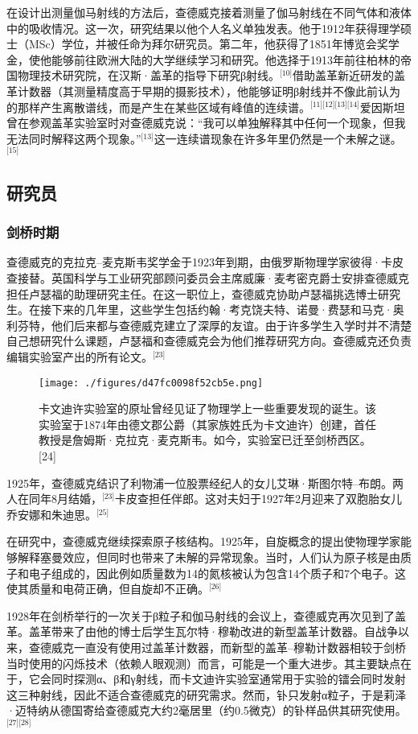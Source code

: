 在设计出测量伽马射线的方法后，查德威克接着测量了伽马射线在不同气体和液体中的吸收情况。这一次，研究结果以他个人名义单独发表。他于1912年获得理学硕士（MSc）学位，并被任命为拜尔研究员。第二年，他获得了1851年博览会奖学金，使他能够前往欧洲大陆的大学继续学习和研究。他选择于1913年前往柏林的帝国物理技术研究院，在汉斯·盖革的指导下研究β射线。\(^\text{[10]}\)借助盖革新近研发的盖革计数器（其测量精度高于早期的摄影技术），他能够证明β射线并不像此前认为的那样产生离散谱线，而是产生在某些区域有峰值的连续谱。\(^\text{[11][12][13][14]}\)爱因斯坦曾在参观盖革实验室时对查德威克说：“我可以单独解释其中任何一个现象，但我无法同时解释这两个现象。”\(^\text{[13]}\)这一连续谱现象在许多年里仍然是一个未解之谜。\(^\text{[15]}\)
\subsection{研究员}
\subsubsection{剑桥时期}
查德威克的克拉克–麦克斯韦奖学金于1923年到期，由俄罗斯物理学家彼得·卡皮查接替。英国科学与工业研究部顾问委员会主席威廉·麦考密克爵士安排查德威克担任卢瑟福的助理研究主任。在这一职位上，查德威克协助卢瑟福挑选博士研究生。在接下来的几年里，这些学生包括约翰·考克饶夫特、诺曼·费瑟和马克·奥利芬特，他们后来都与查德威克建立了深厚的友谊。由于许多学生入学时并不清楚自己想研究什么课题，卢瑟福和查德威克会为他们推荐研究方向。查德威克还负责编辑实验室产出的所有论文。\(^\text{[23]}\)
\begin{figure}[ht]
\centering
\texttt{[image: ./figures/d47fc0098f52cb5e.png]}
\caption{卡文迪许实验室的原址曾经见证了物理学上一些重要发现的诞生。该实验室于1874年由德文郡公爵（其家族姓氏为卡文迪许）创建，首任教授是詹姆斯·克拉克·麦克斯韦。如今，实验室已迁至剑桥西区。[24]} \label{fig_ZMcdw_1}
\end{figure}
1925年，查德威克结识了利物浦一位股票经纪人的女儿艾琳·斯图尔特–布朗。两人在同年8月结婚，\(^\text{[23]}\)卡皮查担任伴郎。这对夫妇于1927年2月迎来了双胞胎女儿乔安娜和朱迪思。\(^\text{[25]}\)

在研究中，查德威克继续探索原子核结构。1925年，自旋概念的提出使物理学家能够解释塞曼效应，但同时也带来了未解的异常现象。当时，人们认为原子核是由质子和电子组成的，因此例如质量数为14的氮核被认为包含14个质子和7个电子。这使其质量和电荷正确，但自旋却不正确。\(^\text{[26]}\)

1928年在剑桥举行的一次关于β粒子和伽马射线的会议上，查德威克再次见到了盖革。盖革带来了由他的博士后学生瓦尔特·穆勒改进的新型盖革计数器。自战争以来，查德威克一直没有使用过盖革计数器，而新型的盖革–穆勒计数器相较于剑桥当时使用的闪烁技术（依赖人眼观测）而言，可能是一个重大进步。其主要缺点在于，它会同时探测α、β和γ射线，而卡文迪许实验室通常用于实验的镭会同时发射这三种射线，因此不适合查德威克的研究需求。然而，钋只发射α粒子，于是莉泽·迈特纳从德国寄给查德威克大约2毫居里（约0.5微克）的钋样品供其研究使用。\(^\text{[27][28]}\)

